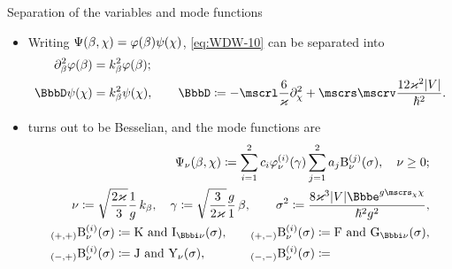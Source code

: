 \documentclass[9pt]{beamer}
\begin{document}
\begin{frame}%
{Separation of the variables and mode functions}%
\begin{itemize}
\item
Writing ${\Psi}\mathopen{}\left(\beta,\chi\right)\mathclose{} = {\varphi}\mathopen{}\left(\beta\right)\mathclose{}
{\psi}\mathopen{}\left(\chi\right)\mathclose{}$, \cref{eq:WDW-10} can be separated into
\begin{align}
\partial_\beta^2\rfun{\varphi}{\beta} &= k_\beta^2\rfun{\varphi}{\beta};\\
\BbbD \rfun{\psi}{\chi} &= k_\beta^2 \rfun{\psi}{\chi},\qquad
\BbbD \coloneqq
-\mscrl \frac{6}{\varkappa} \partial_\chi^2
+ \mscrs\mscrv \frac{12\varkappa^2\vbr{V}}{\hslash^2}.
\label{eq:separated-10}
\end{align}
\item {}
turns out to be Besselian, and the mode functions are
\begin{align}
\rfun{\Psi_\nu}{\beta, \chi} \coloneqq
\sum_{i=1}^2 c_i \rfun{\varphi_{\nu}^{(i)}}{\gamma}
\sum_{j=1}^2 a_j\rfun{\mathrm{B}_{\nu}^{(j)}}{\sigma},\quad
\nu \ge 0; \\
\nu \coloneqq \sqrt{\frac{2\varkappa}{3}}\frac{1}{g}\,k_\beta,\quad
\gamma \coloneqq \sqrt{\frac{3}{2\varkappa}}\frac{g}{1}\,\beta,\qquad
\sigma^2 \coloneqq 
\frac{8\varkappa^3\vbr{V}\ee^{g\mscrs_\chi\chi}}{\hslash^2 g^2},
\label{eq:trsf-quantum-sigma}
\\
\begin{aligned}
\rfun{{}_{\rbr{+,+}}\mathrm{B}^{(i)}_{\nu}}{\sigma} &\coloneqq
\mathrm{K}\text{ and }\rfun{\mathrm{I}_{\ii\nu}}{\sigma},\quad&
\rfun{{}_{\rbr{+,-}}\mathrm{B}^{(i)}_{\nu}}{\sigma} &\coloneqq
\mathrm{F}\text{ and }\rfun{\mathrm{G}_{\ii\nu}}{\sigma},\nonumber \\
\rfun{{}_{\rbr{-,+}}\mathrm{B}^{(i)}_{\nu}}{\sigma} &\coloneqq
\mathrm{J}\text{ and }\rfun{\mathrm{Y}_{\nu}}{\sigma},\quad&
\rfun{{}_{\rbr{-,-}}\mathrm{B}^{(i)}_{\nu}}{\sigma} &\coloneqq

\end{aligned}
\end{align}
\end{itemize}
\end{frame}
\end{document}
